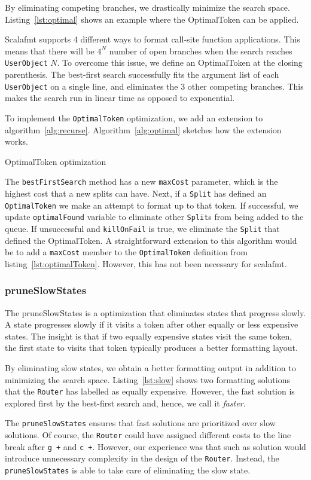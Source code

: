 By eliminating competing branches, we drastically minimize the search space.
Listing~\ref{lst:optimal} shows an example where the OptimalToken can be applied.

Scalafmt supports 4 different ways to format call-site function applications.
This means that there will be $4^N$ number of open branches when the search reaches \texttt{UserObject} $N$.
To overcome this issue, we define an OptimalToken at the closing parenthesis.
The best-first search successfully fits the argument list of each \texttt{UserObject} on a single line, and eliminates the 3 other competing branches.
This makes the search run in linear time as opposed to exponential.

To implement the \texttt{OptimalToken} optimization, we add an extension to algorithm~\ref{alg:recurse}.
Algorithm~\ref{alg:optimal} sketches how the extension works.
\begin{algorithm}
  \caption{OptimalToken optimization}\label{alg:optimal}
  
\end{algorithm}
The \texttt{bestFirstSearch} method has a new \texttt{maxCost} parameter, which is the highest cost that a new splits can have.
Next, if a \texttt{Split} has defined an \texttt{OptimalToken} we make an attempt to format up to that token.
If successful, we update \texttt{optimalFound} variable to eliminate other \texttt{Split}s from being added to the queue.
If unsuccessful and \texttt{killOnFail} is true, we eliminate the \texttt{Split} that defined the OptimalToken.
A straightforward extension to this algorithm would be to add a \texttt{maxCost} member to the \texttt{OptimalToken} definition from listing~\ref{lst:optimalToken}.
However, this has not been necessary for scalafmt.

\subsubsection{pruneSlowStates}
The pruneSlowStates is a optimization that eliminates states that progress slowly.
A state progresses slowly if it visits a token after other equally or less expensive states.
The insight is that if two equally expensive states visit the same token, the first state to visits that token typically produces a better formatting layout.

By eliminating slow states, we obtain a better formatting output in addition to minimizing the search space.
Listing~\ref{lst:slow} shows two formatting solutions that the \texttt{Router} has labelled as equally expensive.
However, the fast solution is explored first by the best-first search and, hence, we call it \emph{faster}.

The \texttt{pruneSlowStates} ensures that fast solutions are prioritized over slow solutions.
Of course, the \texttt{Router} could have assigned different costs to the line break after \texttt{g +} and \texttt{c +}.
However, our experience was that such as solution would introduce unnecessary complexity in the design of the \texttt{Router}.
Instead, the \texttt{pruneSlowStates} is able to take care of eliminating the slow state.

